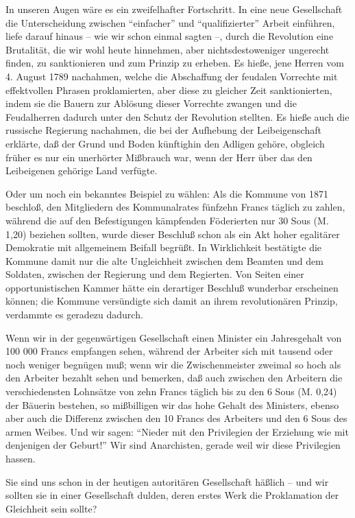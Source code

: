 \documentclass{scrbook}
\begin{document}
In unseren Augen wäre es ein zweifelhafter Fortschritt. In eine neue Gesellschaft die Unterscheidung zwischen ``einfacher'' und ``qualifizierter'' Arbeit einführen, liefe darauf hinaus – wie wir schon einmal sagten –, durch die Revolution eine Brutalität, die wir wohl heute hinnehmen, aber nichtsdestoweniger ungerecht finden, zu sanktionieren und zum Prinzip zu erheben. Es hieße, jene Herren vom 4. August 1789 nachahmen, welche die Abschaffung der feudalen Vorrechte mit effektvollen Phrasen proklamierten, aber diese zu gleicher Zeit sanktionierten, indem sie die Bauern zur Ablösung dieser Vorrechte zwangen und die Feudalherren dadurch unter den Schutz der Revolution stellten. Es hieße auch die russische Regierung nachahmen, die bei der Aufhebung der Leibeigenschaft erklärte, daß der Grund und Boden künftighin den Adligen gehöre, obgleich früher es nur ein unerhörter Mißbrauch war, wenn der Herr über das den Leibeigenen gehörige Land verfügte.

Oder um noch ein bekanntes Beispiel zu wählen: Als die Kommune von 1871 beschloß, den Mitgliedern des Kommunalrates fünfzehn Francs täglich zu zahlen, während die auf den Befestigungen kämpfenden Föderierten nur 30 Sous (M. 1,20) beziehen sollten, wurde dieser Beschluß schon als ein Akt hoher egalitärer Demokratie mit allgemeinem Beifall begrüßt. In Wirklichkeit bestätigte die Kommune damit nur die alte Ungleichheit zwischen dem Beamten und dem Soldaten, zwischen der Regierung und dem Regierten. Von Seiten einer opportunistischen Kammer hätte ein derartiger Beschluß wunderbar erscheinen können; die Kommune versündigte sich damit an ihrem revolutionären Prinzip, verdammte es geradezu dadurch.

Wenn wir in der gegenwärtigen Gesellschaft einen Minister ein Jahresgehalt von 100 000 Francs empfangen sehen, während der Arbeiter sich mit tausend oder noch weniger begnügen muß; wenn wir die Zwischenmeister zweimal so hoch als den Arbeiter bezahlt sehen und bemerken, daß auch zwischen den Arbeitern die verschiedensten Lohnsätze von zehn Francs täglich bis zu den 6 Sous (M. 0,24) der Bäuerin bestehen, so mißbilligen wir das hohe Gehalt des Ministers, ebenso aber auch die Differenz zwischen den 10 Francs des Arbeiters und den 6 Sous des armen Weibes. Und wir sagen: ``Nieder mit den Privilegien der Erziehung wie mit denjenigen der Geburt!'' Wir sind Anarchisten, gerade weil wir diese Privilegien hassen.

Sie sind uns schon in der heutigen autoritären Gesellschaft häßlich – und wir sollten sie in einer Gesellschaft dulden, deren erstes Werk die Proklamation der Gleichheit sein sollte?
\end{document}

